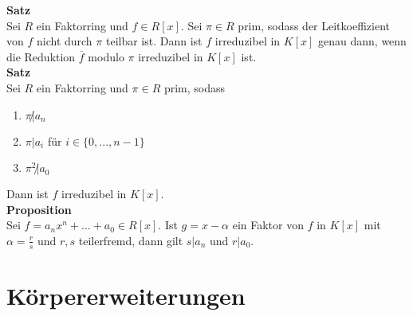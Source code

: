 \documentclass[a4paper, 12pt]{article}
\begin{document}
\textbf{Satz}\\
Sei $R$ ein Faktorring und $f \in R[x]$. Sei $\pi \in R$ prim, sodass der Leitkoeffizient von $f$ nicht durch $\pi$ teilbar ist. Dann ist $f$ irreduzibel in $K[x]$ genau dann, wenn die Reduktion $\overline{f}$ modulo $\pi$ irreduzibel in $K[x]$ ist.\\
\textbf{Satz}\\
Sei $R$ ein Faktorring und $\pi \in R$ prim, sodass \begin{enumerate}
	\item $\pi \not | a_n$
	\item $\pi | a_i$ für $i \in \{0,...,n-1\}$
	\item $\pi^2 \not | a_0$
\end{enumerate}
Dann ist $f$ irreduzibel in $K[x]$.\\
\textbf{Proposition}\\
Sei $f = a_nx^n + ... + a_0 \in R[x]$. Ist $g = x-\alpha$ ein Faktor von $f$ in $K[x]$ mit $\alpha = \frac{r}{s}$ und $r,s$ teilerfremd, dann gilt $s|a_n$ und $r|a_0$.
\section{Körpererweiterungen}
\end{document}
